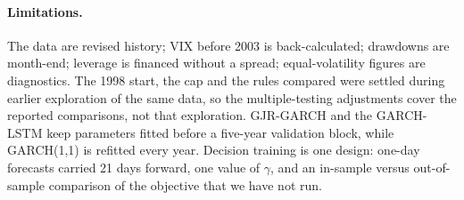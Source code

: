 \paragraph{Limitations.} The data are revised history; VIX before 2003 is back-calculated; drawdowns are month-end; leverage is financed without a spread; equal-volatility figures are diagnostics. The 1998 start, the cap and the rules compared were settled during earlier exploration of the same data, so the multiple-testing adjustments cover the reported comparisons, not that exploration. GJR-GARCH and the GARCH-LSTM keep parameters fitted before a five-year validation block, while GARCH(1,1) is refitted every year. Decision training is one design: one-day forecasts carried 21 days forward, one value of $\gamma$, and an in-sample versus out-of-sample comparison of the objective that we have not run.
